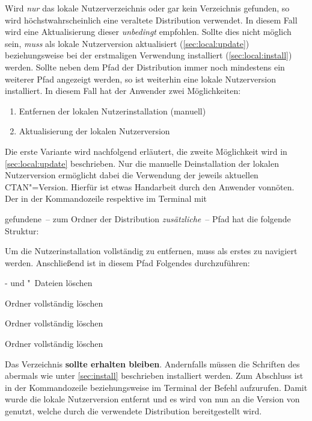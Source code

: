 Wird \emph{nur} das lokale Nutzerverzeichnis oder gar kein Verzeichnis 
gefunden, so wird höchstwahrscheinlich eine veraltete Distribution 
verwendet. In diesem Fall wird eine Aktualisierung dieser \emph{unbedingt} 
empfohlen. Sollte dies nicht möglich sein, \emph{muss} \TUDScript als lokale 
Nutzerversion aktualisiert (\autoref{sec:local:update}) beziehungsweise bei der 
erstmaligen Verwendung installiert (\autoref{sec:local:install}) werden. Sollte 
neben dem Pfad der Distribution immer noch mindestens ein weiterer Pfad 
angezeigt werden, so ist weiterhin eine lokale Nutzerversion installiert. In 
diesem Fall hat der Anwender zwei Möglichkeiten:
%
\begin{enumerate}
\item Entfernen der lokalen Nutzerinstallation (manuell)
\item Aktualisierung der lokalen Nutzerversion
\end{enumerate}
%
Die erste Variante wird nachfolgend erläutert, die zweite Möglichkeit wird in 
\autoref{sec:local:update} beschrieben. Nur die manuelle Deinstallation der 
lokalen Nutzerversion \TUDScript ermöglicht dabei die Verwendung der jeweils 
aktuellen CTAN"=Version. Hierfür ist etwas Handarbeit durch den Anwender 
vonnöten. Der in der Kommandozeile respektive im Terminal mit
%
\begin{quoting}
\end{quoting}
%
gefundene~-- zum Ordner der Distribution \emph{zusätzliche}~-- Pfad hat die 
folgende Struktur:
%
\begin{quoting}
\end{quoting}
%
Um die Nutzerinstallation vollständig zu entfernen, muss als erstes zu 
 navigiert werden. Anschließend ist in diesem 
Pfad Folgendes durchzuführen:
%
\settowidth{}%
\begin{description}[labelwidth=\tempdim,labelsep=1em]
\item[\Path{tex/latex/tudscr/}]- und "~Dateien löschen
\item[\Path{tex/latex/tudscr/}]Ordner  vollständig löschen
\item[\Path{doc/latex/}] Ordner  vollständig löschen
\item[\Path{source/latex/}] Ordner  vollständig löschen
\end{description}
%
Das Verzeichnis  
\textbf{sollte erhalten bleiben}. Andernfalls müssen die Schriften des \CDs 
abermals wie unter \autoref{sec:install} beschrieben installiert werden.
Zum Abschluss ist in der Kommandozeile beziehungsweise im Terminal der Befehl 
 aufzurufen. Damit wurde die lokale Nutzerversion entfernt und es 
wird von nun an die Version von \TUDScript genutzt, welche durch die verwendete 
Distribution bereitgestellt wird.



